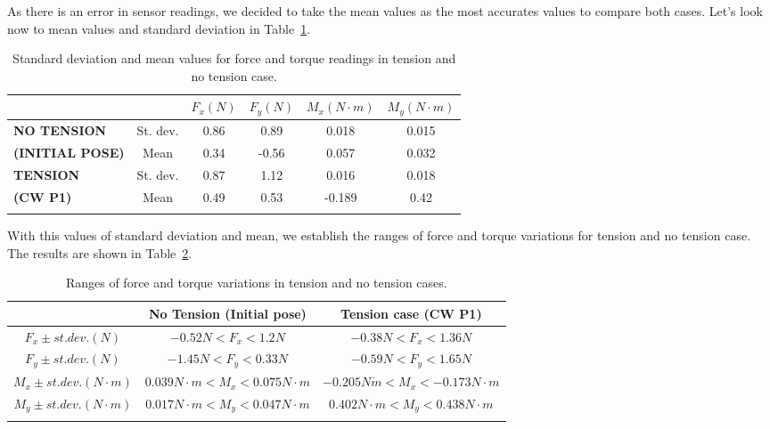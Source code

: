 As there is an error in sensor readings, we decided to take the mean values as the most accurates values to compare both cases. Let's look now to mean values and standard deviation in Table~\ref{tab:mean}.
\setlength\LTpost{0pt}
\begin{longtable}{|l|c|c|c|c|c|}
		\multicolumn{1}{|r}{} &       & \textbf{$F_{x} (N)$} & \textbf{$F_{y} (N)$} & \textbf{$M_{x} (N \cdot m)$} & \textbf{$M_{y} (N \cdot m)$} \\
		\midrule
		\multicolumn{1}{|p{9.125em}|}{\textbf{NO TENSION}} & St. dev. & 0.86  & 0.89  & 0.018  & 0.015 \\
		\cmidrule{2-6}    \textbf{(INITIAL POSE)} & Mean  & 0.34  & -0.56 & 0.057  & 0.032 \\
		\midrule
		\multicolumn{1}{|p{9.125em}|}{\textbf{TENSION}} & St. dev. & 0.87  & 1.12  & 0.016  & 0.018 \\
		\cmidrule{2-6}    \textbf{(CW P1)} & Mean  & 0.49  & 0.53  & -0.189 & 0.42 \\
		\bottomrule
	\caption{Standard deviation and mean values for force and torque readings in tension and no tension case.}
	\label{tab:mean}%
\end{longtable}%

With this values of standard deviation and mean, we establish the ranges of force and torque variations for tension and no tension case. The results are shown in Table~\ref{tab:ranges}.
\setlength\LTpost{0pt}
\begin{longtable}{|c|c|c|}
		\cmidrule{2-3}    \multicolumn{1}{c|}{} & \multicolumn{1}{p{12.915em}|}{\textbf{No Tension (Initial pose)}} & \multicolumn{1}{p{12.915em}|}{\textbf{Tension case (CW P1)}} \\
		\midrule
		\textbf{$F_{x} \pm st. dev. (N)$} & $-0.52 N < F_{x} < 1.2 N$ & $-0.38 N < F_{x} < 1.36 N$ \\
		\midrule
		\textbf{$F_{y} \pm st. dev. (N)$} & $-1.45 N < F_{y} < 0.33 N$ & $-0.59 N < F_{y} < 1.65 N$ \\
		\midrule
		\textbf{$M_{x} \pm st. dev. (N \cdot m)$} & $0.039 N \cdot m < M_{x} < 0.075 N \cdot m$ & $-0.205 N \dot m < M_{x} < -0.173 N \cdot m$ \\
		\midrule
		\textbf{$M_{y} \pm st. dev. (N \cdot m)$} & $0.017 N \cdot m < M_{y} < 0.047 N \cdot m$ & $0.402 N \cdot m < M_{y} < 0.438 N \cdot m$ \\
		\bottomrule
	\caption{Ranges of force and torque variations in tension and no tension cases.}
	\label{tab:ranges}%
\end{longtable}%

